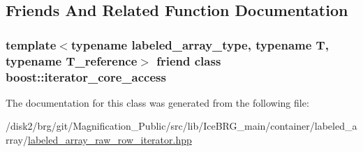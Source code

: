 \subsection{Friends And Related Function Documentation}
\hypertarget{classIceBRG_1_1labeled__array__raw__row__iterator_ac09f73e325921cc50ebcd96bed0f8096}{}
\subsubsection[{boost\+::iterator\+\_\+core\+\_\+access}]{\setlength{\rightskip}{0pt plus 5cm}template$<$typename labeled\+\_\+array\+\_\+type, typename T, typename T\+\_\+reference$>$ friend class boost\+::iterator\+\_\+core\+\_\+access\hspace{0.3cm}{\ttfamily [friend]}}\label{classIceBRG_1_1labeled__array__raw__row__iterator_ac09f73e325921cc50ebcd96bed0f8096}


The documentation for this class was generated from the following file\+:\begin{DoxyCompactItemize}
\item 
/disk2/brg/git/\+Magnification\+\_\+\+Public/src/lib/\+Ice\+B\+R\+G\+\_\+main/container/labeled\+\_\+array/\hyperlink{labeled__array__raw__row__iterator_8hpp}{labeled\+\_\+array\+\_\+raw\+\_\+row\+\_\+iterator.\+hpp}\end{DoxyCompactItemize}
